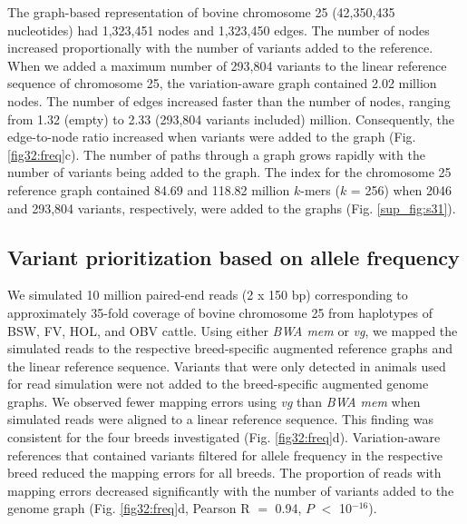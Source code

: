 \documentclass[../main.tex]{subfiles}
\begin{document}
The graph-based representation of bovine chromosome 25 (42,350,435 nucleotides) had 1,323,451 nodes and 1,323,450 edges. The number of nodes increased proportionally with the number of variants added to the reference. When we added a maximum number of 293,804 variants to the linear reference sequence of chromosome 25, the variation-aware graph contained 2.02 million nodes. The number of edges increased faster than the number of nodes, ranging from 1.32 (empty) to 2.33 (293,804 variants included) million. Consequently, the edge-to-node ratio increased when variants were added to the graph (Fig. \ref{fig32:freq}c). The number of paths through a graph grows rapidly with the number of variants being added to the graph. The index for the chromosome 25 reference graph contained 84.69 and 118.82 million $k$-mers ($k$ = 256) when 2046 and 293,804 variants, respectively, were added to the graphs (Fig. \ref{sup_fig:s31}).


\subsection*{Variant prioritization based on allele frequency}
We simulated 10 million paired-end reads (2 x 150 bp) corresponding to approximately 35-fold coverage of bovine chromosome 25 from haplotypes of BSW, FV, HOL, and OBV cattle. Using either \emph{BWA mem} or \emph{vg}, we mapped the simulated reads to the respective breed-specific augmented reference graphs and the linear reference sequence. Variants that were only detected in animals used for read simulation were not added to the breed-specific augmented genome graphs. We observed fewer mapping errors using \emph{vg} than \emph{BWA mem} when simulated reads were aligned to a linear reference sequence. This finding was consistent for the four breeds investigated (Fig. \ref{fig32:freq}d). Variation-aware references that contained variants filtered for allele frequency in the respective breed reduced the mapping errors for all breeds. The proportion of reads with mapping errors decreased significantly with the number of variants added to the genome graph (Fig. \ref{fig32:freq}d, Pearson R $=$ 0.94, $P$ $<$ 10$^{-16}$).
\end{document}
